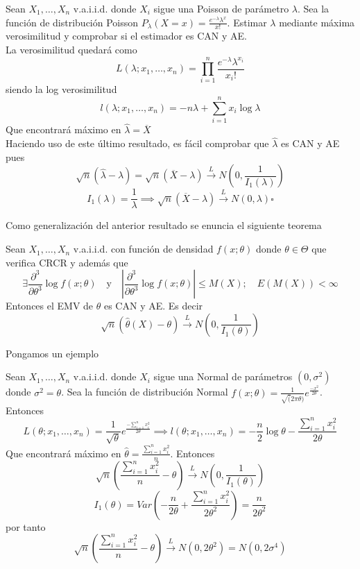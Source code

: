 \begin{exercise}
    Sean $X_1, \dots, X_n$ v.a.i.i.d. donde $X_i$ sigue una Poisson de parámetro $\lambda$. Sea la función de distribución Poisson $P_\lambda(X=x)=\frac{e^{-\lambda}\lambda^x}{x!}$. Estimar $\lambda$ mediante máxima verosimilitud y comprobar si el estimador es CAN y AE. \\
    La verosimilitud quedará como
    \[
        L(\lambda;x_1,\dots,x_n)=\prod_{i=1}^{n}\frac{e^{-\lambda}\lambda^{x_i}}{{x_i}!}
    \]
    siendo la log verosimilitud
    \[
        l(\lambda; x_1,\dots,x_n)=-n\lambda+\sum_{i=1}^{n}x_i\log\lambda
    \]
    Que encontrará máximo en $\hat{\lambda}=\overline{X}$ \\
    Haciendo uso de este último resultado, es fácil comprobar que $\hat{\lambda}$ es CAN y AE pues
    \[
        \sqrt{n}(\hat{\lambda}-\lambda)=\sqrt{n}(\overline{X}-\lambda) \overset{L}{\to}N(0,\frac{1}{I_1(\lambda)})
    \]
    \[
        I_1(\lambda)=\frac{1}{\lambda} \implies \sqrt{n}(\overline{X}-\lambda)\overset{L}{\to}N(0,\lambda)\square
    \]
\end{exercise}

\newpage

Como generalización del anterior resultado se enuncia el siguiente teorema

\begin{theorem}
    Sean $X_1,\dots,X_n$ v.a.i.i.d. con función de densidad $f(x;\theta)$ donde $\theta \in \Theta$ que verifica CRCR y además que
    \[
        \exists \frac{\partial^3}{\partial \theta^3}\log f(x;\theta) \quad \text{y} \quad \left|\frac{\partial^3}{\partial \theta^3}\log f(x;\theta)\right| \leq M(X); \quad E(M(X))<\infty
    \]
    Entonces el EMV de $\theta$ es CAN y AE. Es decir
    \[
        \sqrt{n}(\hat{\theta}(X)-\theta)\overset{L}{\to}N(0,\frac{1}{I_1(\theta)})
    \]
\end{theorem}

Pongamos un ejemplo

\begin{exercise}
    Sean $X_1, \dots, X_n$ v.a.i.i.d. donde $X_i$ sigue una Normal de parámetros $(0,\sigma^2)$ donde $\sigma^2=\theta$. Sea la función de distribución Normal $f(x;\theta)=\frac{1}{\sqrt(2\pi\theta)}e^{\frac{-x^2}{2\theta}}$. Entonces
    \[
        L(\theta;x_1,\dots,x_n)=\frac{1}{\sqrt{\theta}}e^{\frac{-\sum_{i=1}^{n}x^2_i}{2\theta}} \implies l(\theta;x_1,\dots,x_n)=-\frac{n}{2}\log\theta - \frac{\sum_{i=1}^{n}x^2_i}{2\theta}
    \]
    Que encontrará máximo en $\hat{\theta}=\frac{\sum_{i=1}^{n}x^2_i}{n}$. Entonces
    \[
        \sqrt{n}\left(\frac{\sum_{i=1}^{n}x^2_i}{n}-\theta\right)\overset{L}{\to}N\left(0,\frac{1}{I_1(\theta)}\right)
    \]
    \[
        I_1(\theta)=Var\left(-\frac{n}{2\theta}+\frac{\sum_{i=1}^{n}x^2_i}{2\theta^2}\right)=\frac{n}{2\theta^2}
    \]
    por tanto
    \[
        \sqrt{n}\left(\frac{\sum_{i=1}^{n}x^2_i}{n}-\theta\right) \overset{L}{\to}N(0,2\theta^2) = N(0,2\sigma^4)
    \]
\end{exercise}

